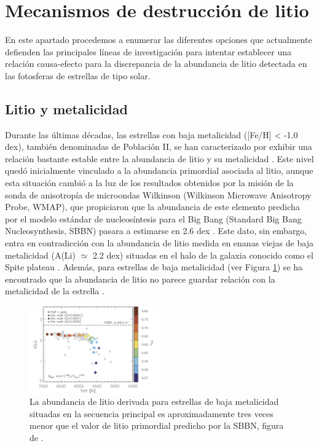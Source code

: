 \section{Mecanismos de destrucción de litio}
En este apartado procedemos a enumerar las diferentes opciones que actualmente defienden las principales líneas de investigación para intentar establecer una relación causa-efecto para la discrepancia de la abundancia de litio detectada en las fotosferas de estrellas de tipo solar.\par

\subsection{Litio y metalicidad}
Durante las últimas décadas, las estrellas con baja metalicidad ([Fe/H] < -1.0 dex), también denominadas de Población II, se han caracterizado por exhibir una relación bastante estable entre la abundancia de litio y su metalicidad \citep{Guiglion2016}. Este nivel quedó inicialmente vinculado a la abundancia primordial asociada al litio, aunque esta situación cambió a la luz de los resultados obtenidos por la misión de la sonda de anisotropía de microondas Wilkinson (Wilkinson Microwave Anisotropy Probe, WMAP), que propiciaron que la abundancia de este elemento predicha por el modelo estándar de nucleosíntesis para el Big Bang (Standard Big Bang Nucleosynthesis, SBBN) pasara a estimarse en 2.6 dex \citep{Spergel2003}. Este dato, sin embargo, entra en contradicción con la abundancia de litio medida en enanas viejas de baja metalicidad  (A(Li) $\simeq$ 2.2 dex) situadas en el halo de la galaxia conocido como el Spite plateau \citep{Spite1982}. Además, para estrellas de baja metalicidad (ver Figura \ref{fig:li_abundances_sbbn}) se ha encontrado que la abundancia de litio no parece guardar relación con la metalicidad de la estrella \citep{Fu2015}.\par


\begin{figure}
	\centering
	\includegraphics[width=0.5\textwidth]{img/tesis/li_abundances_sbbn.pdf}
	\caption{La abundancia de litio derivada para estrellas de baja metalicidad situadas en la secuencia principal es aproximadamente tres veces menor que el valor de litio primordial predicho por la SBBN, figura de \cite{Fu2015}.}
	\label{fig:li_abundances_sbbn}
\end{figure}

